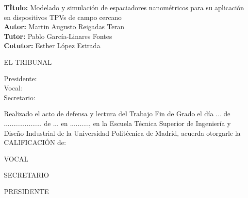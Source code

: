 \cleardoublepage

\begin{flushleft} \large
\textbf{TÌtulo:} Modelado y simulación de espaciadores nanométricos para su aplicación en dispositivos TPVs de campo cercano \\
\textbf{Autor:} Martin Augusto Reigadas Teran\\
\textbf{Tutor:} Pablo García-Linares Fontes \\ 
\textbf{Cotutor:} Esther López Estrada\\ [1 cm]

\end{flushleft} 

\begin{center} \LARGE
EL TRIBUNAL \\ [1 cm]
\end{center}

\begin{flushleft} \LARGE
Presidente: \\ [1 cm]
Vocal: \\ [1 cm]
Secretario: \\ [1.5 cm]
\end{flushleft}

\large
Realizado el acto de defensa y lectura del Trabajo Fin de Grado el día ... de ....................   de ... en .........., en la Escuela Técnica Superior de Ingeniería y Diseño Industrial de la Universidad Politécnica de Madrid, acuerda otorgarle la CALIFICACIÓN de: \\ [2 cm]

\begin{center}
 \large VOCAL \\ [2.2 cm]
\end{center}

\begin{minipage}{0.5\textwidth}
 \begin{flushleft}
 \large SECRETARIO
\end{flushleft}
\end{minipage}
\begin{minipage}{0.5\textwidth}
\begin{flushright}
 \large PRESIDENTE
\end{flushright} 
\end{minipage}